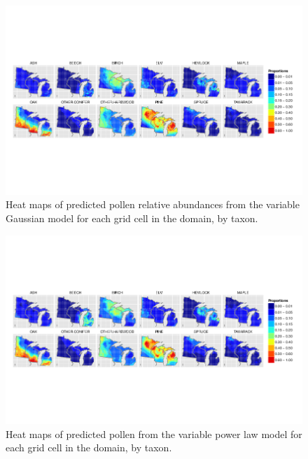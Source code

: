 

\begin{figure}
\centering
\includegraphics[width=7in]{figures/maps_predicted_pollen_g_flexible.png}
\caption{Heat maps of predicted pollen relative abundances from the
  variable Gaussian model for each grid cell in the domain, by taxon.}
\label{fig:maps_pollen_g}
\end{figure}


\begin{figure}
\centering
\includegraphics[width=7in]{figures/maps_predicted_pollen_pl_flexible.png}
\caption{Heat maps of predicted pollen from the variable power law model for each grid cell in the domain, by taxon.}
\label{fig:maps_pollen_pl}
\end{figure}

